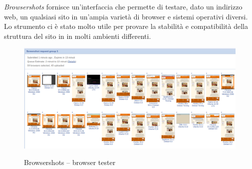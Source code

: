 \emph{Browsershots} fornisce un'interfaccia che permette di testare, dato un indirizzo web, un qualsiasi sito in un'ampia varietà di browser 
e sistemi operativi diversi.\\
Lo strumento ci è stato molto utile per provare la stabilità e compatibilità della struttura del sito in in molti ambienti differenti.

\begin{figure}[!h]
	\centering
	\includegraphics[width=0.7\linewidth]{sezioni/FaseTest/Immagini/browsershots.png}\\
	\caption{Browsershots – browser tester}
	\label{Fig:browsershots}
\end{figure} 
\newpage